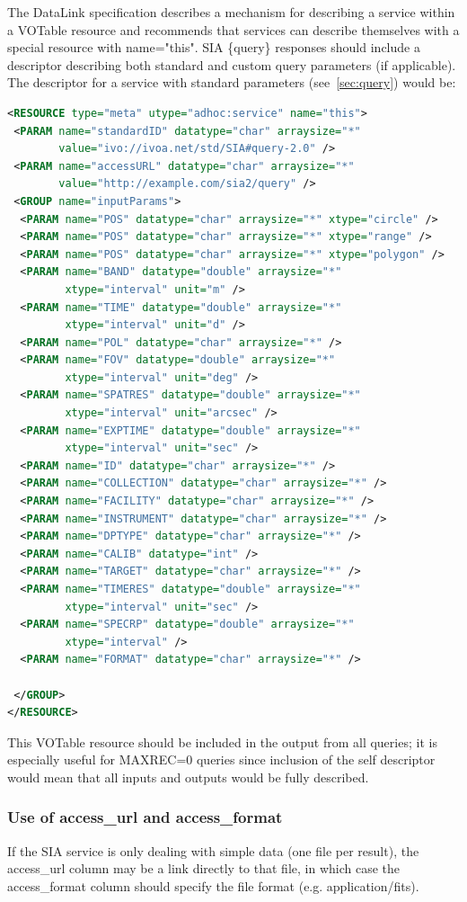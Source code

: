 \documentclass[11pt,a4paper]{ivoa}
\begin{document}
The DataLink specification describes a mechanism for describing a service within a VOTable resource and recommends that services can describe themselves with a special resource with name="this". SIA \{query\} responses should include a descriptor describing both standard and custom query parameters (if applicable). The descriptor for a service with standard parameters (see~\ref{sec:query}) would be:
\begin{lstlisting}[language=XML]
<RESOURCE type="meta" utype="adhoc:service" name="this">
 <PARAM name="standardID" datatype="char" arraysize="*"
        value="ivo://ivoa.net/std/SIA#query-2.0" />
 <PARAM name="accessURL" datatype="char" arraysize="*"
        value="http://example.com/sia2/query" />
 <GROUP name="inputParams">
  <PARAM name="POS" datatype="char" arraysize="*" xtype="circle" />
  <PARAM name="POS" datatype="char" arraysize="*" xtype="range" />
  <PARAM name="POS" datatype="char" arraysize="*" xtype="polygon" />
  <PARAM name="BAND" datatype="double" arraysize="*" 
         xtype="interval" unit="m" />
  <PARAM name="TIME" datatype="double" arraysize="*" 
         xtype="interval" unit="d" />
  <PARAM name="POL" datatype="char" arraysize="*" />
  <PARAM name="FOV" datatype="double" arraysize="*" 
         xtype="interval" unit="deg" />
  <PARAM name="SPATRES" datatype="double" arraysize="*" 
         xtype="interval" unit="arcsec" />
  <PARAM name="EXPTIME" datatype="double" arraysize="*" 
         xtype="interval" unit="sec" />
  <PARAM name="ID" datatype="char" arraysize="*" />
  <PARAM name="COLLECTION" datatype="char" arraysize="*" />
  <PARAM name="FACILITY" datatype="char" arraysize="*" />
  <PARAM name="INSTRUMENT" datatype="char" arraysize="*" />
  <PARAM name="DPTYPE" datatype="char" arraysize="*" />
  <PARAM name="CALIB" datatype="int" />
  <PARAM name="TARGET" datatype="char" arraysize="*" />
  <PARAM name="TIMERES" datatype="double" arraysize="*" 
         xtype="interval" unit="sec" />
  <PARAM name="SPECRP" datatype="double" arraysize="*" 
         xtype="interval" />
  <PARAM name="FORMAT" datatype="char" arraysize="*" />

 </GROUP>
</RESOURCE>

\end{lstlisting}
This VOTable resource should be included in the output from all queries; it is especially useful for MAXREC=0 queries since inclusion of the self descriptor would mean that all inputs and outputs would be fully described.




\subsubsection{Use of access\_url and access\_format}
If the SIA service is only dealing with simple data (one file per result), the access\_url column may be a link directly to that file, in which case the access\_format column should specify the file format (e.g. application/fits). 
\end{document}
